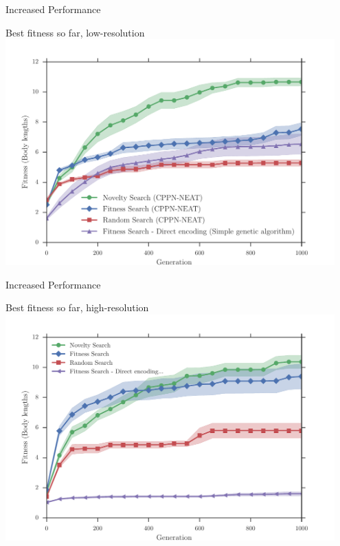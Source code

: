\documentclass[6pt]{beamer}
\begin{document}
{\begin{frame}{Increased Performance}
\begin{block}{Best fitness so far, low-resolution}
\centering
\includegraphics[width=0.95\textwidth]{../Figures/Results/FitNovRandomDirectSize5.pdf}
\end{block}
\end{frame}

\begin{frame}{Increased Performance}
\begin{block}{Best fitness so far, high-resolution}
\centering
\includegraphics[width=0.95\textwidth]{../Figures/Results/FitvsNovVsDirSize10.pdf}
\end{block}
\end{frame}



}
\end{document}
